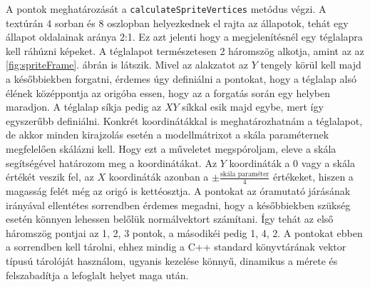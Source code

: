 A pontok meghatározását a \texttt{calculateSpriteVertices} metódus végzi. A textúrán 4 sorban és 8 oszlopban helyezkednek el rajta az állapotok, tehát egy állapot oldalainak aránya 2:1. Ez azt jelenti hogy a megjelenítésnél egy téglalapra kell ráhúzni képeket. A téglalapot természetesen 2 háromszög alkotja, amint az az \ref{fig:spriteFrame}. ábrán is látszik. 
Mivel az alakzatot az $Y$ tengely körül kell majd a későbbiekben forgatni, érdemes úgy definiálni a pontokat, hogy a téglalap alsó élének középpontja az origóba essen, hogy az a forgatás során egy helyben maradjon. A téglalap síkja pedig az $XY$ síkkal esik majd egybe, mert így egyszerűbb definiálni. Konkrét koordinátákkal is meghatározhatnám a téglalapot, de akkor minden kirajzolás esetén a modellmátrixot a skála paraméternek megfelelően skálázni kell. Hogy ezt a műveletet megspóroljam, eleve a skála segítségével határozom meg a koordinátákat. Az $Y$ koordináták a 0 vagy a skála értékét veszik fel, az $X$ koordináták azonban a $\pm \frac{\text{skála paraméter}}{4}$ értékeket, hiszen a magasság felét még az origó is kettéosztja. A pontokat az óramutató járásának irányával ellentétes sorrendben érdemes megadni, hogy a későbbiekben szükség esetén könnyen lehessen belőlük normálvektort számítani. Így tehát az első háromszög pontjai az 1, 2, 3 pontok, a másodikéi pedig 1, 4, 2. A pontokat ebben a sorrendben kell tárolni, ehhez mindig a C++ standard könyvtárának vektor típusú tárolóját használom, ugyanis kezelése könnyű, dinamikus a mérete és felszabadítja a lefoglalt helyet maga után.

